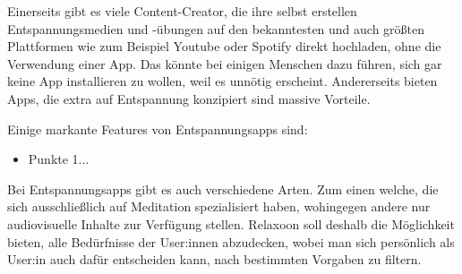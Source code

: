 Einerseits gibt es viele Content-Creator, die ihre selbst erstellen Entspannungsmedien und -übungen auf den bekanntesten und
auch größten Plattformen wie zum Beispiel Youtube oder Spotify direkt hochladen, ohne die Verwendung einer App.
Das könnte bei einigen Menschen dazu führen, sich gar keine App installieren zu wollen, weil es unnötig erscheint.
Andererseits bieten Apps, die extra auf Entspannung konzipiert sind massive Vorteile. 

Einige markante Features von Entspannungsapps sind:

\begin{itemize}
    \item Punkte 1...
\end{itemize}

Bei Entspannungsapps gibt es auch verschiedene Arten. Zum einen welche, die sich ausschließlich auf Meditation
spezialisiert haben, wohingegen andere nur audiovisuelle Inhalte zur Verfügung stellen. Relaxoon soll deshalb
die Möglichkeit bieten, alle Bedürfnisse der User:innen abzudecken, wobei man sich persönlich als User:in 
auch dafür entscheiden kann, nach bestimmten Vorgaben zu filtern.

